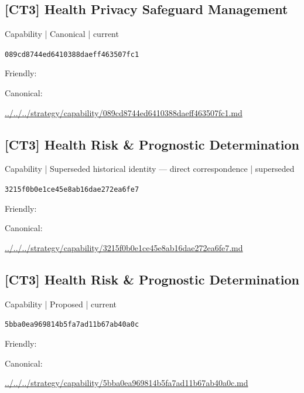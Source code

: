 \documentclass[10pt,a4paper]{article}
\begin{document}
\subsection*{[CT3] Health Privacy Safeguard Management}
{\small Capability | Canonical | current}\par
\texttt{089cd8744ed6410388daeff463507fc1}\par
Friendly: \par
Canonical: \par
{\footnotesize\url{../../../strategy/capability/089cd8744ed6410388daeff463507fc1.md}}\par
\subsection*{[CT3] Health Risk \& Prognostic Determination}
{\small Capability | Superseded historical identity — direct correspondence | superseded}\par
\texttt{3215f0b0e1ce45e8ab16dae272ea6fe7}\par
Friendly: \par
Canonical: \par
{\footnotesize\url{../../../strategy/capability/3215f0b0e1ce45e8ab16dae272ea6fe7.md}}\par
\subsection*{[CT3] Health Risk \& Prognostic Determination}
{\small Capability | Proposed | current}\par
\texttt{5bba0ea969814b5fa7ad11b67ab40a0c}\par
Friendly: \par
Canonical: \par
{\footnotesize\url{../../../strategy/capability/5bba0ea969814b5fa7ad11b67ab40a0c.md}}\par
\end{document}
